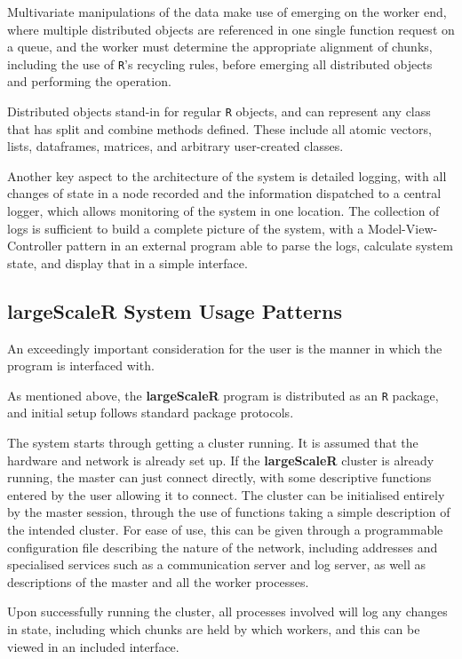 Multivariate manipulations of the data make use of emerging on the worker end, where multiple distributed objects are referenced in one single function request on a queue, and the worker must determine the appropriate alignment of chunks, including the use of \texttt{R}'s recycling rules, before emerging all distributed objects and performing the operation.

Distributed objects stand-in for regular \texttt{R} objects, and can represent any class that has split and combine methods defined.
These include all atomic vectors, lists, dataframes, matrices, and arbitrary user-created classes.

Another key aspect to the architecture of the system is detailed logging, with all changes of state in a node recorded and the information dispatched to a central logger, which allows monitoring of the system in one location. The collection of logs is sufficient to build a complete picture of the system, with a Model-View-Controller pattern in an external program able to parse the logs, calculate system state, and display that in a simple interface\cite{gamma1995design}.

\subsection{\textbf{largeScaleR} System Usage Patterns}

An exceedingly important consideration for the user is the manner in which the program is interfaced with.

As mentioned above, the \textbf{largeScaleR} program is distributed as an \texttt{R} package, and initial setup follows standard package protocols.

The system starts through getting a cluster running.
It is assumed that the hardware and network is already set up.
If the \textbf{largeScaleR} cluster is already running, the master can just connect directly, with some descriptive functions entered by the user allowing it to connect.
The cluster can be initialised entirely by the master session, through the use of functions taking a simple description of the intended cluster.
For ease of use, this can be given through a programmable configuration file describing the nature of the network, including addresses and specialised services such as a communication server and log server, as well as descriptions of the master and all the worker processes.

Upon successfully running the cluster, all processes involved will log any changes in state, including which chunks are held by which workers, and this can be viewed in an included interface.

